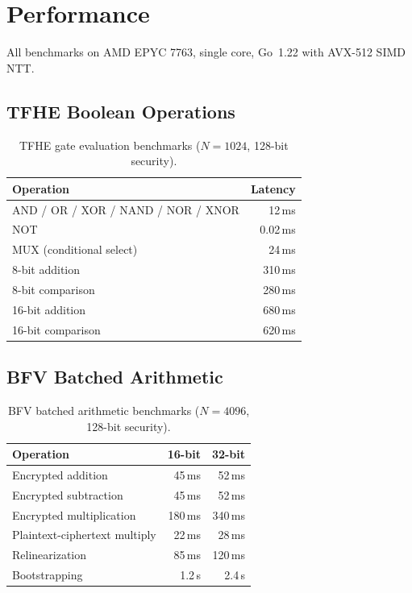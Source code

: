 \section{Performance}

\label{sec:performance}

All benchmarks on AMD EPYC 7763, single core, Go~1.22 with AVX-512 SIMD NTT.

\subsection{TFHE Boolean Operations}

\begin{table}[ht]
\centering
\caption{TFHE gate evaluation benchmarks ($N = 1024$, 128-bit security).}
\label{tab:tfhe-benchmarks}
\begin{tabular}{lr}
\toprule
\textbf{Operation} & \textbf{Latency} \\
\midrule
AND / OR / XOR / NAND / NOR / XNOR & 12\,ms \\
NOT & 0.02\,ms \\
MUX (conditional select) & 24\,ms \\
8-bit addition & 310\,ms \\
8-bit comparison & 280\,ms \\
16-bit addition & 680\,ms \\
16-bit comparison & 620\,ms \\
\bottomrule
\end{tabular}
\end{table}

\subsection{BFV Batched Arithmetic}

\begin{table}[ht]
\centering
\caption{BFV batched arithmetic benchmarks ($N = 4096$, 128-bit security).}
\label{tab:bfv-benchmarks}
\begin{tabular}{lrr}
\toprule
\textbf{Operation} & \textbf{16-bit} & \textbf{32-bit} \\
\midrule
Encrypted addition & 45\,ms & 52\,ms \\
Encrypted subtraction & 45\,ms & 52\,ms \\
Encrypted multiplication & 180\,ms & 340\,ms \\
Plaintext-ciphertext multiply & 22\,ms & 28\,ms \\
Relinearization & 85\,ms & 120\,ms \\
Bootstrapping & 1.2\,s & 2.4\,s \\
\bottomrule
\end{tabular}
\end{table}

